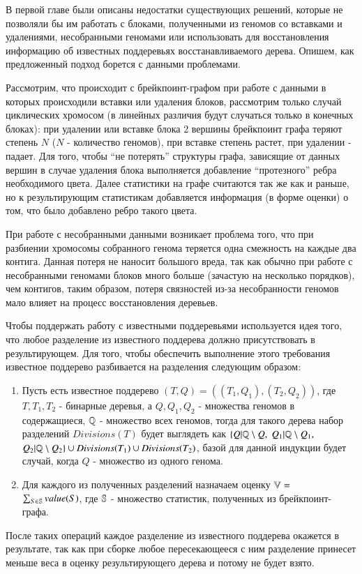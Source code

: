 В первой главе были описаны недостатки существующих решений, которые не позволяли бы им работать с блоками, полученными из геномов со вставками
и удалениями, несобранными геномами или использовать для восстановления информацию об известных поддеревьях восстанавливаемого дерева.
Опишем, как предложенный подход борется с данными проблемами.

Рассмотрим, что происходит с брейкпоинт-графом при работе с данными в которых происходили вставки или удаления блоков,
рассмотрим только случай циклических хромосом (в линейных различия будут случаться только в конечных блоках):
при удалении или вставке блока 2 вершины брейкпоинт графа теряют степень $N$ ($N$ - количество геномов), при вставке степень растет,
при удалении - падает.
Для того, чтобы ``не потерять'' структуры графа, зависящие от данных вершин в случае удаления блока выполняется добавление ``протезного'' ребра
необходимого цвета.
Далее статистики на графе считаются так же как и раньше, но к результирующим статистикам добавляется информация (в форме оценки) о том,
что было добавлено ребро такого цвета.

При работе с несобранными данными возникает проблема того, что при разбиении хромосомы собранного генома теряется одна смежность на каждые
два контига.
Данная потеря не наносит большого вреда, так как обычно при работе с несобранными геномами блоков много больше (зачастую на несколько порядков),
чем контигов, таким образом, потеря связностей из-за несобранности геномов мало влияет на процесс восстановления деревьев.

Чтобы поддержать работу с известными поддеревьями используется идея того, что любое разделение из известного поддерева должно присутствовать в результирующем.
Для того, чтобы обеспечить выполнение этого требования известное поддерево разбивается на разделения следующим образом:
\begin{enumerate}
  \item Пусть есть известное поддерево $(T, Q) = ((T_1, Q_1), (T_2, Q_2))$, где $T, T_1, T_2$ - бинарные деревья,
    а $Q, Q_1, Q_2$ - множества геномов в содержащиеся, $\mathbb{Q}$ - множество всех геномов,
    тогда для такого дерева набор разделений $Divisions(T)$ будет выглядеть как
    $\{Q|\mathbb{Q} \setminus  Q,$ $Q_1|\mathbb{Q} \setminus Q_1,$ $Q_2|\mathbb{Q} \setminus Q_2\} \cup Divisions(T_1) \cup Divisions(T_2)$,
    базой для данной индукции будет случай, когда $Q$ - множество из одного генома.
  \item Для каждого из полученных разделений назначаем оценку $\mathbb{V}=$ \\
    $\sum\nolimits_{S \in \mathbb{S}} value(S)$, где $\mathbb{S}$ - множество статистик, полученных из брейкпоинт-графа.
\end{enumerate}
После таких операций каждое разделение из известного поддерева окажется в результате, так как при сборке любое пересекающееся с ним разделение
принесет меньше веса в оценку результирующего дерева и потому не будет взято.
